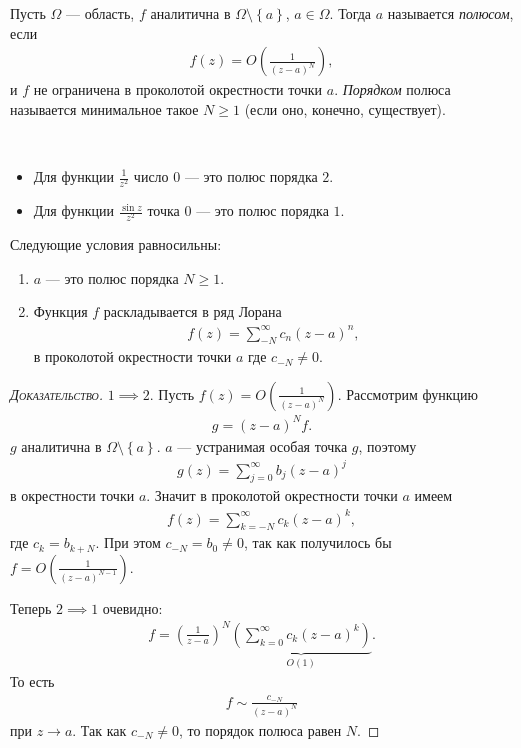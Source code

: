 \documentclass[../complex-analysis.tex]{subfiles}
\begin{document}
\begin{df}[полюс]
 Пусть $ \Omega $ --- область, $ f $ аналитична в $ \Omega \setminus \left\{ a \right\} $, $ a \in \Omega $. Тогда $ a $ называется \textit{полюсом}, если
 \begin{align*}
  f(z) = O \left( \frac{1}{(z-a)^{N}} \right),
 \end{align*} и $ f $ не ограничена в проколотой окрестности точки $ a $. \textit{Порядком} полюса называется минимальное такое $ N \geqslant 1 $ (если оно, конечно, существует).
\end{df}
\begin{exmpl}\
 \begin{itemize}
  \item Для функции $ \frac{1}{z^{2}} $ число $ 0 $ --- это полюс порядка $ 2 $.
  \item Для функции $ \frac{\sin z}{z^{2}} $ точка $ 0 $ --- это полюс порядка $ 1 $.
 \end{itemize}
\end{exmpl}
\begin{thm}
 Следующие условия равносильны:
 \begin{enumerate}
  \item $ a $ --- это полюс порядка $ N \geqslant 1$.
  \item Функция $ f $ раскладывается в ряд Лорана
   \begin{align*}
    f(z) = \sum_{-N}^{\infty} c_n(z-a)^{n},
   \end{align*} в проколотой окрестности точки $ a $ где $ c_{-N} \neq 0 $.
 \end{enumerate}
\end{thm}
\begin{proof}[\normalfont\textsc{Доказательство}]
 $  1 \implies 2 $. Пусть $ f(z) = O (\frac{1}{(z-a)^{N}}) $. Рассмотрим функцию
 \begin{align*}
  g = (z-a)^{N} f.
 \end{align*} $ g $ аналитична в $ \Omega \setminus \left\{ a \right\} $. $ a $ --- устранимая особая точка $ g $, поэтому
 \begin{align*}
  g(z) = \sum_{j=0}^{\infty} b_j(z-a)^{j}
 \end{align*} в окрестности точки $ a $. Значит в проколотой окрестности точки $ a $ имеем
 \begin{align*}
  f(z) = \sum_{k=-N}^{\infty} c_k (z-a)^{k},
 \end{align*} где $ c_k = b_{k+N} $. При этом $ c_{-N} = b_0 \neq 0 $, так как получилось бы $ f = O \left( \frac{1}{(z-a)^{N-1}} \right) $.

 Теперь $ 2 \implies 1 $ очевидно:
 \begin{align*}
  f = \left(\frac{1}{z-a} \right)^{N} \underbrace{\left( \sum_{k=0}^{\infty} c_{k} (z-a)^{k} \right)}_{O(1)}.
 \end{align*} То есть
 \begin{align*}
  f \sim \frac{c_{-N}}{(z-a)^{N}}
 \end{align*} при $ z \to a $. Так как $ c_{-N} \neq 0 $, то порядок полюса равен $ N $.
\end{proof}
\end{document}
